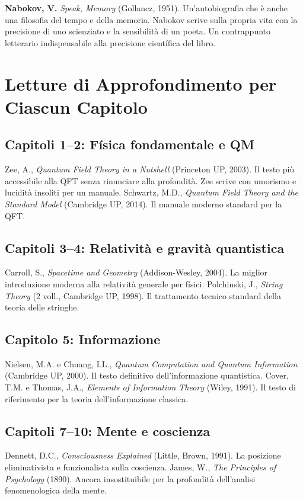 \documentclass[11.5pt,a4paper,openany]{book}
\theoremstyle{remark}
\begin{document}
\textbf{Nabokov, V.} \textit{Speak, Memory} (Gollancz, 1951). Un'autobiografia che è anche una filosofia del tempo e della memoria. Nabokov scrive sulla propria vita con la precisione di uno scienziato e la sensibilità di un poeta. Un contrappunto letterario indispensabile alla precisione científica del libro.

\section{Letture di Approfondimento per Ciascun Capitolo}

\subsection*{Capitoli 1--2: Física fondamentale e QM}
Zee, A., \textit{Quantum Field Theory in a Nutshell} (Princeton UP, 2003). Il testo più accessibile alla QFT senza rinunciare alla profondità. Zee scrive con umorismo e lucidità insoliti per un manuale. Schwartz, M.D., \textit{Quantum Field Theory and the Standard Model} (Cambridge UP, 2014). Il manuale moderno standard per la QFT.

\subsection*{Capitoli 3--4: Relatività e gravità quantistica}
Carroll, S., \textit{Spacetime and Geometry} (Addison-Wesley, 2004). La miglior introduzione moderna alla relatività generale per físici. Polchinski, J., \textit{String Theory} (2 voll., Cambridge UP, 1998). Il trattamento tecnico standard della teoria delle stringhe.

\subsection*{Capitolo 5: Informazione}
Nielsen, M.A. e Chuang, I.L., \textit{Quantum Computation and Quantum Information} (Cambridge UP, 2000). Il testo definitivo dell'informazione quantistica. Cover, T.M. e Thomas, J.A., \textit{Elements of Information Theory} (Wiley, 1991). Il testo di riferimento per la teoria dell'informazione classica.

\subsection*{Capitoli 7--10: Mente e coscienza}
Dennett, D.C., \textit{Consciousness Explained} (Little, Brown, 1991). La posizione eliminativista e funzionalista sulla coscienza. James, W., \textit{The Principles of Psychology} (1890). Ancora insostituibile per la profondità dell'analisi fenomenologica della mente.
\end{document}
